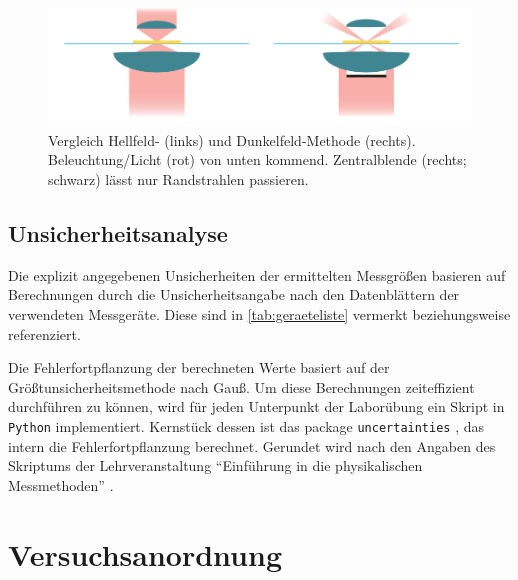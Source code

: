 \documentclass[ngerman]{scrartcl}
\begin{document}
\begin{figure}[H]
    \centering
    \begin{samepage}
        \includegraphics[width=\linewidth]{fig/Hell_vs_Dunkelfeld.png}
        \caption[Aufbau eines Dunkelfeldmikroskop]{Vergleich Hellfeld- (links) und Dunkelfeld-Methode (rechts). Beleuchtung/Licht (rot) von unten kommend. Zentralblende (rechts; schwarz) lässt nur Randstrahlen passieren.}
        \label{fig:hellfeld_skizze}
    \end{samepage}
\end{figure}

\subsection{Unsicherheitsanalyse}
\label{subsec:unsicherheitsanalyse}

Die explizit angegebenen Unsicherheiten der ermittelten Messgrößen basieren auf Berechnungen durch die Unsicherheitsangabe nach den Datenblättern der verwendeten Messgeräte. Diese sind in \autoref{tab:geraeteliste} vermerkt beziehungsweise referenziert.

Die Fehlerfortpflanzung der berechneten Werte basiert auf der Größtunsicherheitsmethode nach Gauß. Um diese Berechnungen zeiteffizient durchführen zu können, wird für jeden Unterpunkt der Laborübung ein Skript in \verb!Python! implementiert. Kernstück dessen ist das package \verb!uncertainties! \cite{ref:uncertainties}, das intern die Fehlerfortpflanzung berechnet. Gerundet wird nach den Angaben des Skriptums der Lehrveranstaltung \enquote{Einführung in die physikalischen Messmethoden} \cite{ref:messmethoden}.



\section{Versuchsanordnung}
\label{sec:versuchsanordnung}
\end{document}
